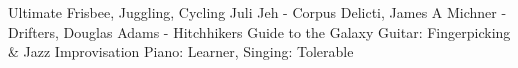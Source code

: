   \begin{cvskills} 
		{Ultimate Frisbee, Juggling, Cycling}
		{Juli Jeh - Corpus Delicti, James A Michner - Drifters, Douglas Adams - Hitchhikers Guide to the Galaxy}
    {Guitar: Fingerpicking \& Jazz Improvisation
\newline
Piano: Learner, Singing: Tolerable}
  \end{cvskills}
